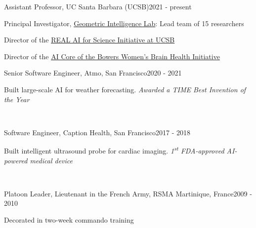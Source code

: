 
\begin{joblong}{Assistant Professor, UC Santa Barbara (UCSB)}{2021 - present}
\item Principal Investigator, \href{https://gi.ece.ucsb.edu/}{Geometric Intelligence Lab}: Lead team of 15 researchers
\item Director of the \href{https://www.ai.ece.ucsb.edu/}{REAL AI for Science Initiative at UCSB}
\item Director of the \href{https://wbhi.ucsb.edu/}{AI Core of the Bowers Women's Brain Health Initiative}
\end{joblong}

\begin{joblong}{Senior Software Engineer, Atmo, San Francisco}{2020 - 2021}
\item Built large-scale AI for weather forecasting. \textit{Awarded a TIME Best Invention of the Year}
\end{joblong}~\vspace{-3mm}

\begin{joblong}{Software Engineer, Caption Health, San Francisco}{2017 - 2018}
\item Built  intelligent ultrasound probe for cardiac imaging. \textit{1\textsuperscript{st} FDA-approved AI-powered medical device}
\end{joblong}~\vspace{-3mm}

\begin{joblong}{Platoon Leader, Lieutenant in the French Army, RSMA Martinique, France}{2009 - 2010}
\item Decorated in two-week commando training
\end{joblong}~\vspace{-3mm}
